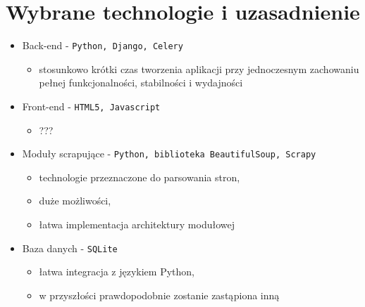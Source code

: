 \documentclass[12pt, titlepage]{article}
\begin{document}
	\section{Wybrane technologie i uzasadnienie}
	\begin{itemize}
		\item Back-end - \texttt{Python, Django, Celery}
		\begin{itemize}
			\item stosunkowo krótki czas tworzenia aplikacji przy jednoczesnym zachowaniu pełnej funkcjonalności, stabilności i wydajności
		\end{itemize}
		\item Front-end - \texttt{HTML5, Javascript}
		\begin{itemize}
			\item ???
		\end{itemize}
		\item Moduły scrapujące - \texttt{Python, biblioteka BeautifulSoup, Scrapy}
		\begin{itemize}
			\item technologie przeznaczone do parsowania stron,
			\item duże możliwości,
			\item łatwa implementacja architektury modułowej
		\end{itemize}
		\item Baza danych - \texttt{SQLite}
		\begin{itemize}
			\item łatwa integracja z językiem Python,
			\item w przyszłości prawdopodobnie zostanie zastąpiona inną
		\end{itemize}
	\end{itemize}
\end{document}
